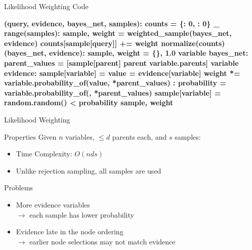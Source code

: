 \documentclass[14pt]{beamer}
\begin{document}
\begin{frame}[fragile]{Likelihood Weighting Code}
\begin{semiverbatim}\scriptsize\bfseries
{} (query, evidence, bayes_net, samples):
    \pause{}
    counts = \{: \num{0}, : \num{0}\}
     _  range(samples):
        sample, weight = weighted_sample(bayes_net, evidence)
        counts[sample[query]] += weight
    \pause{}
     normalize(counts)
\pause
{} (bayes_net, evidence):
    \pause{}
    sample, weight = \{\}, \num{1.0}
     variable  bayes_net:
        parent_values = [sample[parent]  parent  variable.parents]
        \pause{}
         variable  evidence:
            sample[variable] = value = evidence[variable]
            weight *= variable.probability_of(value, *parent_values)
        \pause{}
        :
            probability = variable.probability_of(, *parent_values)
            sample[variable] = random.random() < probability
    \pause{} sample, weight
\end{semiverbatim}
\end{frame}

\begin{frame}{Likelihood Weighting}
	\begin{block}{Properties}
		Given $n$ variables, $\leq d$ parents each, and $s$ samples:
		\begin{itemize}
			\item Time Complexity: \pause $O(nds)$
			\pause
			\item Unlike rejection sampling, all samples are used
		\end{itemize}
	\end{block}
	\pause
	\begin{block}{Problems}
		\begin{itemize}
			\item More evidence variables \\
			      $\rightarrow$ each sample has lower probability
			\pause
			\item Evidence late in the node ordering \\
			      $\rightarrow$ earlier node selections may not match evidence
		\end{itemize}
	\end{block}
\end{frame}
\end{document}
